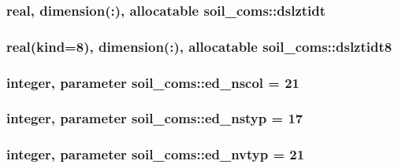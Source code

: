 \subsubsection[{\texorpdfstring{dslztidt}{dslztidt}}]{\setlength{\rightskip}{0pt plus 5cm}real, dimension(\+:), allocatable soil\+\_\+coms\+::dslztidt}\hypertarget{namespacesoil__coms_a40f71a36860d25e091b99e5ecead9cbe}{}\label{namespacesoil__coms_a40f71a36860d25e091b99e5ecead9cbe}
\subsubsection[{\texorpdfstring{dslztidt8}{dslztidt8}}]{\setlength{\rightskip}{0pt plus 5cm}real(kind=8), dimension(\+:), allocatable soil\+\_\+coms\+::dslztidt8}\hypertarget{namespacesoil__coms_aed792678a3757670fef365202ee15c39}{}\label{namespacesoil__coms_aed792678a3757670fef365202ee15c39}
\subsubsection[{\texorpdfstring{ed\+\_\+nscol}{ed_nscol}}]{\setlength{\rightskip}{0pt plus 5cm}integer, parameter soil\+\_\+coms\+::ed\+\_\+nscol = 21}\hypertarget{namespacesoil__coms_a359b4988ce0556dd6f2138752c38d3dc}{}\label{namespacesoil__coms_a359b4988ce0556dd6f2138752c38d3dc}
\subsubsection[{\texorpdfstring{ed\+\_\+nstyp}{ed_nstyp}}]{\setlength{\rightskip}{0pt plus 5cm}integer, parameter soil\+\_\+coms\+::ed\+\_\+nstyp = 17}\hypertarget{namespacesoil__coms_a354035bf03f4bb65c1636100aa6737e8}{}\label{namespacesoil__coms_a354035bf03f4bb65c1636100aa6737e8}
\subsubsection[{\texorpdfstring{ed\+\_\+nvtyp}{ed_nvtyp}}]{\setlength{\rightskip}{0pt plus 5cm}integer, parameter soil\+\_\+coms\+::ed\+\_\+nvtyp = 21}\hypertarget{namespacesoil__coms_a8cb5da734a6673c4b75b841d0b4221aa}{}\label{namespacesoil__coms_a8cb5da734a6673c4b75b841d0b4221aa}
